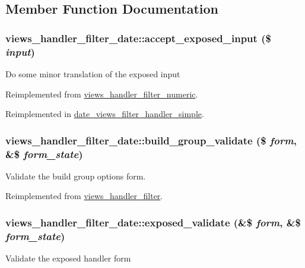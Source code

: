 \subsection{Member Function Documentation}
\hypertarget{classviews__handler__filter__date_a063da758bf1832f38454620cbc94e304}{
\subsubsection[{accept\_\-exposed\_\-input}]{\setlength{\rightskip}{0pt plus 5cm}views\_\-handler\_\-filter\_\-date::accept\_\-exposed\_\-input (\$ {\em input})}}
\label{classviews__handler__filter__date_a063da758bf1832f38454620cbc94e304}
Do some minor translation of the exposed input 

Reimplemented from \hyperlink{classviews__handler__filter__numeric_a0fd6abb3062be32410bef3c1cefdaaf5}{views\_\-handler\_\-filter\_\-numeric}.

Reimplemented in \hyperlink{classdate__views__filter__handler__simple_af129fdbfc4ec0a307289b09e25bd5190}{date\_\-views\_\-filter\_\-handler\_\-simple}.\hypertarget{classviews__handler__filter__date_aa5ba23cd2f32402635c1fca175cfaa01}{
\subsubsection[{build\_\-group\_\-validate}]{\setlength{\rightskip}{0pt plus 5cm}views\_\-handler\_\-filter\_\-date::build\_\-group\_\-validate (\$ {\em form}, \/  \&\$ {\em form\_\-state})}}
\label{classviews__handler__filter__date_aa5ba23cd2f32402635c1fca175cfaa01}
Validate the build group options form. 

Reimplemented from \hyperlink{classviews__handler__filter_a301d05b76bbcfcf5e45cc2e802714759}{views\_\-handler\_\-filter}.\hypertarget{classviews__handler__filter__date_a0146f5fd6dee328506fc6f29006eb401}{
\subsubsection[{exposed\_\-validate}]{\setlength{\rightskip}{0pt plus 5cm}views\_\-handler\_\-filter\_\-date::exposed\_\-validate (\&\$ {\em form}, \/  \&\$ {\em form\_\-state})}}
\label{classviews__handler__filter__date_a0146f5fd6dee328506fc6f29006eb401}
Validate the exposed handler form 

